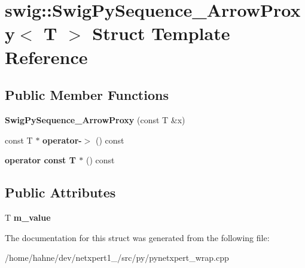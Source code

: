\hypertarget{structswig_1_1SwigPySequence__ArrowProxy}{}\section{swig\+:\+:Swig\+Py\+Sequence\+\_\+\+Arrow\+Proxy$<$ T $>$ Struct Template Reference}
\label{structswig_1_1SwigPySequence__ArrowProxy}
\subsection*{Public Member Functions}
\begin{DoxyCompactItemize}
\item 
{\bfseries Swig\+Py\+Sequence\+\_\+\+Arrow\+Proxy} (const T \&x)\hypertarget{structswig_1_1SwigPySequence__ArrowProxy_a28b1117f7ac65b3ec51101215306a9d9}{}\label{structswig_1_1SwigPySequence__ArrowProxy_a28b1117f7ac65b3ec51101215306a9d9}

\item 
const T $\ast$ {\bfseries operator-\/$>$} () const \hypertarget{structswig_1_1SwigPySequence__ArrowProxy_a035427f35fdd8d16e83402a18d43998f}{}\label{structswig_1_1SwigPySequence__ArrowProxy_a035427f35fdd8d16e83402a18d43998f}

\item 
{\bfseries operator const T $\ast$} () const \hypertarget{structswig_1_1SwigPySequence__ArrowProxy_a76baddd748c4aa53d751408f4fabd05b}{}\label{structswig_1_1SwigPySequence__ArrowProxy_a76baddd748c4aa53d751408f4fabd05b}

\end{DoxyCompactItemize}
\subsection*{Public Attributes}
\begin{DoxyCompactItemize}
\item 
T {\bfseries m\+\_\+value}\hypertarget{structswig_1_1SwigPySequence__ArrowProxy_a7e68416553925e7556e737325c324e0f}{}\label{structswig_1_1SwigPySequence__ArrowProxy_a7e68416553925e7556e737325c324e0f}

\end{DoxyCompactItemize}


The documentation for this struct was generated from the following file\+:\begin{DoxyCompactItemize}
\item 
/home/hahne/dev/netxpert1\+\_/src/py/pynetxpert\+\_\+wrap.\+cpp\end{DoxyCompactItemize}
